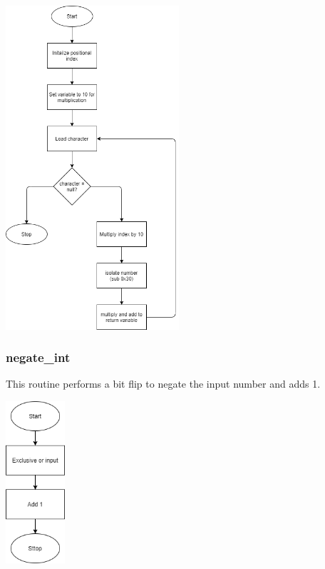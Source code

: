 \documentclass{article}
\begin{document}
        \begin{center}
            {\includegraphics[height=12cm]{str2int.png}\centering} 
        \end{center}

    \newpage
    \subsubsection{negate\_int}
        This routine performs a bit flip to negate the input number and
        adds 1.
        \begin{center}
            {\includegraphics[height=6cm]{negate_int.png}\centering} 
        \end{center}
\end{document}
